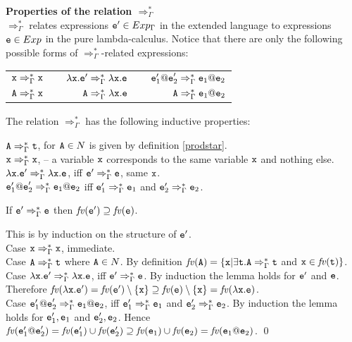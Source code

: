 \documentclass{LMCS}
\newcommand{\fl}{\noindent}
\newcommand{\bt}{\begin{tabular}}
\newcommand{\et}{\end{tabular}}
\newcommand{\blem}{\begin{lem}}
\newcommand{\elem}{\end{lem}}
\newcommand{\bprf}{\proof}
\newcommand{\eprf}{\qed}
\theoremstyle{definition}\newtheorem{env}[thm]{Environment}
\begin{document}
\fl \textbf{Properties of the relation $\Rightarrow^*_\Gamma$}\\
$\Rightarrow^*_\Gamma$ relates expressions ${\tt e}'\in Exp_\Gamma$ in
the extended language to expressions ${\tt e}\in Exp$ in the pure
lambda-calculus.  Notice that there are only the following possible
forms of $\Rightarrow^*_\Gamma$-related expressions:  

\bt{rrrrr}
${\tt x} \Rightarrow^*_\Gamma {\tt x}$ & &
$\lambda {\tt x}.{\tt e}'\Rightarrow^*_\Gamma \lambda {\tt x}.{\tt e}$ & &
${\tt e}_1'{\tt @e}_2'\Rightarrow^*_\Gamma {\tt e}_1{\tt @e}_2$\\
${\tt A}\Rightarrow^*_\Gamma {\tt x}$ & &
${\tt A}\Rightarrow^*_\Gamma \lambda {\tt x}.{\tt e}$ & &
${\tt A}\Rightarrow^*_\Gamma {\tt e}_1{\tt @e}_2$\\
\et
\medskip


\fl The relation $\Rightarrow^*_\Gamma$ has the following inductive properties:\medskip

\fl${\tt A}\Rightarrow^*_\Gamma {\tt t}$, for ${\tt A}\in N$ is given by definition \ref{prodstar}.\\
${\tt x}\Rightarrow^*_\Gamma {\tt x}$, -- a variable ${\tt x}$ corresponds to the same variable ${\tt x}$ and nothing else. \\
$\lambda {\tt x}.{\tt e}'\Rightarrow^*_\Gamma\lambda {\tt x}.{\tt e}$, iff ${\tt e}'\Rightarrow^*_\Gamma {\tt e}$, same ${\tt x}$.\\
${\tt e}_1'{\tt @e}_2'\Rightarrow^*_\Gamma {\tt e}_1{\tt @e}_2$ iff ${\tt e}_1'\Rightarrow^*_\Gamma {\tt e}_1$ and ${\tt e}_2'\Rightarrow^*_\Gamma {\tt e}_2$.\medskip

\blem If ${\tt e}'\Rightarrow^*_\Gamma {\tt e}$ then $\mathit{fv}({\tt e}')\supseteq \mathit{fv}({\tt e})$.
\elem

\bprf This is by induction on the structure of ${\tt e}'$.\\
Case ${\tt x}\Rightarrow^*_\Gamma {\tt x}$, immediate.\\ 
Case ${\tt A}\Rightarrow^*_\Gamma {\tt t}$ where ${\tt A}\in N$. By definition $\mathit{fv}({\tt A}) = \{{\tt x}|\exists {\tt t}. {\tt A}\Rightarrow^*_\Gamma {\tt t}$ and ${\tt x}\in \mathit{fv}({\tt t})\}$.\\
Case $\lambda {\tt x}.{\tt e}'\Rightarrow^*_\Gamma \lambda {\tt x}.{\tt e}$, iff ${\tt e}'\Rightarrow^*_\Gamma {\tt e}$. By induction the lemma holds for ${\tt e}'$ and ${\tt e}$.
Therefore $\mathit{fv}(\lambda {\tt x}.{\tt e}')= \mathit{fv}({\tt e}')\setminus\{{\tt x}\}\supseteq \mathit{fv}({\tt e})\setminus\{{\tt x}\}= \mathit{fv}(\lambda {\tt x}.{\tt e})$.\\ 
Case ${\tt e}_1'{\tt @e}_2'\Rightarrow^*_\Gamma {\tt e}_1{\tt @e}_2$, iff ${\tt e}_1'\Rightarrow^*_\Gamma {\tt e}_1$ and ${\tt e}_2'\Rightarrow^*_\Gamma {\tt e}_2$. By induction the lemma holds for ${\tt e}_1',{\tt e}_1$ and ${\tt e}_2',{\tt e}_2$.
Hence $\mathit{fv}({\tt e}_1'{\tt @e}_2')= \mathit{fv}({\tt e}_1') \cup \mathit{fv}({\tt e}_2')\supseteq \mathit{fv}({\tt e}_1) \cup \mathit{fv}({\tt e}_2)= \mathit{fv}({\tt e}_1{\tt @e}_2)$.
\eprf
\end{document}

